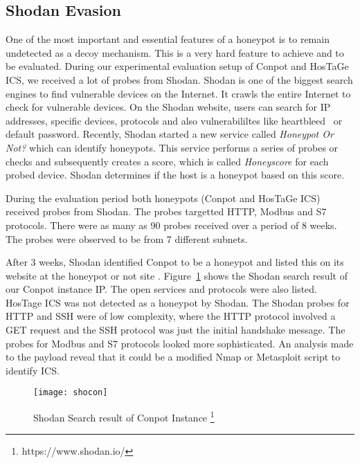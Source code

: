 \documentclass[article,msc=informatik,type=msc,colorback,accentcolor=tud9c]{tudthesis}
\begin{document}
	
	
	\vspace{5mm} 
	\subsection{Shodan Evasion}\label{Shodan Evasion}
		One of the most important and essential features of a honeypot is to remain undetected as a decoy mechanism. This is a very hard feature to achieve and to be evaluated. During our experimental evaluation setup of Conpot and HosTaGe ICS, we received a lot of probes from Shodan.
		Shodan is one of the biggest search engines to find vulnerable devices on the Internet. It crawls the entire Internet to check for vulnerable devices. On the Shodan website, users can search for \ac{IP} addresses, specific devices, protocols and also vulnerabililtes like heartbleed~\cite{durumeric2014matter} or default password.
		Recently, Shodan started a new service called \textit{Honeypot Or Not?} which can identify honeypots. This service performs a series of probes or checks and subsequently creates a score, which is called \textit{Honeyscore} for each probed device. Shodan determines if the host is a honeypot based on this score.
		
		\vspace{3mm}
		During the evaluation period both honeypots (Conpot and HosTaGe ICS) received  probes from Shodan. The probes targetted HTTP, Modbus and S7 protocols. There were as many as 90 probes received over a period of 8 weeks. The probes were observed to be from 7 different subnets. 
		
		\vspace{5mm} 
		After 3 weeks, Shodan identified  Conpot to be a honeypot and listed this on its website at the honeypot or not site . Figure~\ref{f:Shodan Search result of Conpot Instance} shows the Shodan search result of our Conpot instance \ac{IP}. The open services and protocols were also listed. HosTage ICS was not detected as a honeypot by Shodan. The Shodan probes for HTTP and SSH were of low complexity, where the HTTP protocol involved a GET request and the SSH protocol was just the initial handshake message. The probes for Modbus and S7 protocols looked more sophisticated. An analysis made to the payload reveal that it could be a modified Nmap or Metasploit script to identify \ac{ICS}.
		
			
			\begin{figure}[H]
					\centering
					\texttt{[image: shocon]}
					\caption[Shodan Search result of Conpot Instance ]{\label{f:Shodan Search result of Conpot Instance}Shodan Search result of Conpot Instance \footnote{https://www.shodan.io/}}
					\end{figure}
		
\end{document}
